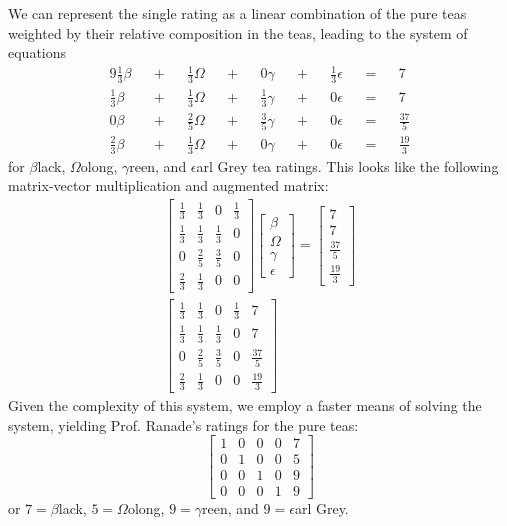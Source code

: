 \documentclass[]{article}
\begin{document}
We can represent the single rating as a linear combination of the pure teas weighted by their relative composition in the teas, leading to the system of equations
\begin{alignat}{9}
	\frac{1}{3} \beta && + && \frac{1}{3} \Omega && + && 0 \gamma && + && \frac{1}{3} \epsilon && = && 7 \\
	\frac{1}{3} \beta && + && \frac{1}{3} \Omega && + && \frac{1}{3} \gamma && + && 0 \epsilon && = && 7 \\
	0 \beta && + && \frac{2}{5} \Omega && + && \frac{3}{5} \gamma && + && 0 \epsilon && = && \frac{37}{5} \\
	\frac{2}{3} \beta && + && \frac{1}{3} \Omega && + && 0 \gamma && + && 0 \epsilon && = && \frac{19}{3}
\end{alignat}
for \(\beta\)lack, \(\Omega\)olong, \(\gamma\)reen, and \(\epsilon\)arl Grey tea ratings. This looks like the following matrix-vector multiplication and augmented matrix:
\begin{gather}
	\begin{bmatrix}
	\frac{1}{3} & \frac{1}{3} & 0 & \frac{1}{3} \\
	\frac{1}{3} & \frac{1}{3} & \frac{1}{3} & 0 \\
	0 & \frac{2}{5} & \frac{3}{5} & 0 \\
	\frac{2}{3} & \frac{1}{3} & 0 & 0
	\end{bmatrix}
	\begin{bmatrix}
	\beta \\
	\Omega \\
	\gamma \\
	\epsilon
	\end{bmatrix}
	=
	\begin{bmatrix}
	7 \\
	7 \\
	\frac{37}{5} \\
	\frac{19}{3}
	\end{bmatrix} \\
	\left[
	\begin{array}{cccc|c}
	\frac{1}{3} & \frac{1}{3} & 0 & \frac{1}{3} & 7 \\
	\frac{1}{3} & \frac{1}{3} & \frac{1}{3} & 0 & 7 \\
	0 & \frac{2}{5} & \frac{3}{5} & 0 & \frac{37}{5} \\
	\frac{2}{3} & \frac{1}{3} & 0 & 0 & \frac{19}{3}
	\end{array}
	\right]
\end{gather}
Given the complexity of this system, we employ a faster means of solving the system, yielding Prof. Ranade's ratings for the pure teas: 
\begin{equation}
	\left[
	\begin{array}{cccc|c}
	1 & 0 & 0 & 0 & 7 \\
	0 & 1 & 0 & 0 & 5 \\
	0 & 0 & 1 & 0 & 9 \\
	0 & 0 & 0 & 1 & 9
	\end{array}
	\right]
\end{equation}
or \(7 = \beta\)lack, \(5 = \Omega\)olong, \(9 = \gamma\)reen, and \(9 = \epsilon\)arl Grey. 
\end{document}
